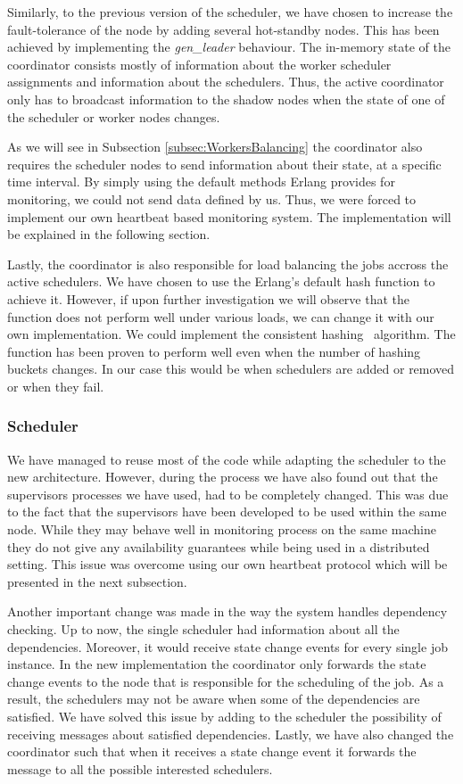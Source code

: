 \documentclass[11pt,a4paper,twoside]{report}
\begin{document}
Similarly, to the previous version of the scheduler, we have chosen to increase the fault-tolerance of the node by adding several hot-standby nodes. This has been achieved by implementing the \textit{gen\_leader} behaviour. The in-memory state of the coordinator consists mostly of information about the worker scheduler assignments and information about the schedulers. Thus, the active coordinator only has to broadcast information to the shadow nodes when the state of one of the scheduler or worker nodes changes.


As we will see in Subsection \ref{subsec:WorkersBalancing} the coordinator also requires the scheduler nodes to send information about their state, at a specific time interval. By simply using the default methods Erlang provides for monitoring, we could not send data defined by us. Thus, we were forced to implement our own heartbeat based monitoring system. The implementation will be explained in the following section.


Lastly, the coordinator is also responsible for load balancing the jobs accross the active schedulers. We have chosen to use the Erlang's default hash function to achieve it. However, if upon further investigation we will observe that the function does not perform well under various loads, we can change it with our own implementation. We could implement the consistent hashing~\cite{ConsistentHashing} algorithm. The function has been proven to perform well even when the number of hashing buckets changes. In our case this would be when schedulers are added or removed or when they fail.

\subsubsection{Scheduler}
We have managed to reuse most of the code while adapting the scheduler to the new architecture. However, during the process we have also found out that the supervisors processes we have used, had to be completely changed. This was due to the fact that the supervisors have been developed to be used within the same node. While they may behave well in monitoring process on the same machine they do not give any availability guarantees while being used in a distributed setting. This issue was overcome using our own heartbeat protocol which will be presented in the next subsection.


Another important change was made in the way the system handles dependency checking. Up to now, the single scheduler had information about all the dependencies. Moreover, it would receive state change events for every single job instance. In the new implementation the coordinator only forwards the state change events to the node that is responsible for the scheduling of the job. As a result, the schedulers may not be aware when some of the dependencies are satisfied. We have solved this issue by adding to the scheduler the possibility of receiving messages about satisfied dependencies. Lastly, we have also changed the coordinator such that when it receives a state change event it forwards the message to all the possible interested schedulers.
\end{document}
